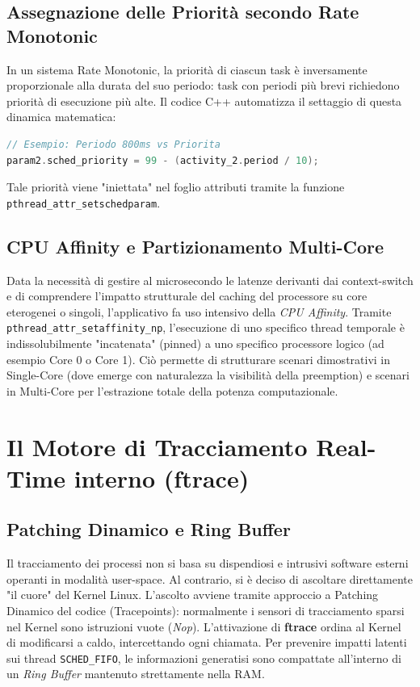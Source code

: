 \documentclass[a4paper,12pt]{report}
\begin{document}
\section{Assegnazione delle Priorità secondo Rate Monotonic}
In un sistema Rate Monotonic, la priorità di ciascun task è inversamente proporzionale alla durata del suo periodo: task con periodi più brevi richiedono priorità di esecuzione più alte. 
Il codice C++ automatizza il settaggio di questa dinamica matematica:
\begin{lstlisting}[language=C++]
// Esempio: Periodo 800ms vs Priorita
param2.sched_priority = 99 - (activity_2.period / 10);
\end{lstlisting}
Tale priorità viene "iniettata" nel foglio attributi tramite la funzione \verb!pthread_attr_setschedparam!. 

\section{CPU Affinity e Partizionamento Multi-Core}
Data la necessità di gestire al microsecondo le latenze derivanti dai context-switch e di comprendere l'impatto strutturale del caching del processore su core eterogenei o singoli, l'applicativo fa uso intensivo della \textit{CPU Affinity}. Tramite \verb!pthread_attr_setaffinity_np!, l'esecuzione di uno specifico thread temporale è indissolubilmente "incatenata" (pinned) a uno specifico processore logico (ad esempio Core 0 o Core 1).
Ciò permette di strutturare scenari dimostrativi in Single-Core (dove emerge con naturalezza la visibilità della preemption) e scenari in Multi-Core per l'estrazione totale della potenza computazionale.

\chapter{Il Motore di Tracciamento Real-Time interno (ftrace)}
\section{Patching Dinamico e Ring Buffer}
Il tracciamento dei processi non si basa su dispendiosi e intrusivi software esterni operanti in modalità user-space. Al contrario, si è deciso di ascoltare direttamente "il cuore" del Kernel Linux.
L'ascolto avviene tramite approccio a Patching Dinamico del codice (Tracepoints): normalmente i sensori di tracciamento sparsi nel Kernel sono istruzioni vuote (\textit{Nop}). L'attivazione di \textbf{ftrace} ordina al Kernel di modificarsi a caldo, intercettando ogni chiamata. Per prevenire impatti latenti sui thread \verb!SCHED_FIFO!, le informazioni generatisi sono compattate all'interno di un \textit{Ring Buffer} mantenuto strettamente nella RAM.
\end{document}

